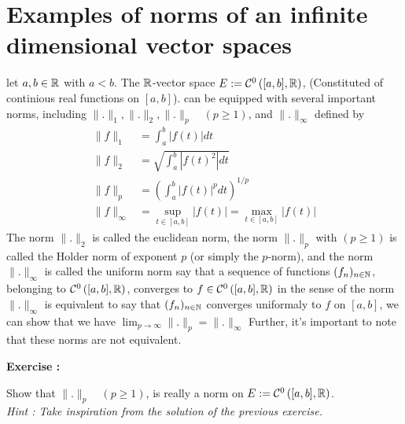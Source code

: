 % 
% 

\lecday[2025-02-11]

% 

\section{Examples of norms of an infinite dimensional vector spaces}
let $a,b \in \mathbb{R} $ with $a < b$. The $\mathbb{R} $-vector space 
$E := \mathcal{C}^{0} \left( [a,b] , \mathbb{R}  \right)$, 
(Constituted of continious real functions on 
$[a,b] $). can be equipped with several important norms, 
including  $\| . \|_{1}, \| . \| _{2}, \| . \| _{p} \quad 
\left( p \geq 1 \right)$, and $\| . \| _{\infty }$ defined by
\begin{align*}
	\| f \| _{1} &= 
	\int_{a}^{b} \left| f(t)  \right|dt  \\
	\| f \| _{2} &= 
	\sqrt{\int_{a}^{b} \left| f(t) ^2  \right|dt} 
	\\
	\| f \| _{p} &= 
	\left( 
		\int_{a}^{b} 
		\left| f(t)  \right|^{p}dt
	\right)^{1/p} \\
	\| f \| _{\infty } &=
	\sup_{t \in [a,b] } 
	\left| f(t)  \right| = 
	\max_{t \in [a,b] }\left| f(t)  \right|
\end{align*}
The norm $\| . \| _{2}$  is called the euclidean norm, the 
norm $\| . \| _{p}$ with $\left( p \geq 1 \right)$ is called
the Holder norm of exponent $p$ (or simply the $p$-norm), 
and the norm $\| . \| _{\infty }$ is called the uniform norm
say that a sequence of functions $(f_{n})_{n \in \mathbb{N}}$, 
belonging to 
$\mathcal{C} ^{0} \left( [a,b] ,\mathbb{R}  \right)$, converges to
$f \in \mathcal{C} ^{0}\left( [a,b] ,\mathbb{R}  \right)$ in the 
sense of the norm 
$\| . \| _{\infty }$  is equivalent to say that 
$(f_{n})_{n \in \mathbb{N}}$ converges uniformaly to 
$f$ on $[a,b]$, we can show that we have 
$\lim_{p \to \infty } \| . \| _{p} = \| . \|_{\infty }$ Further, 
it's important to note that these norms are not equivalent.
\begin{center}
	\textbf{Exercise : }
\end{center}
Show that $\| . \| _{p} \quad \left( p \geq 1 \right)$, is really
a norm on $E := \mathcal{C} ^{0} \left( [a,b], \mathbb{R} \right)$. \\
\it Hint : Take inspiration from the solution of the previous exercise.
\normalfont
